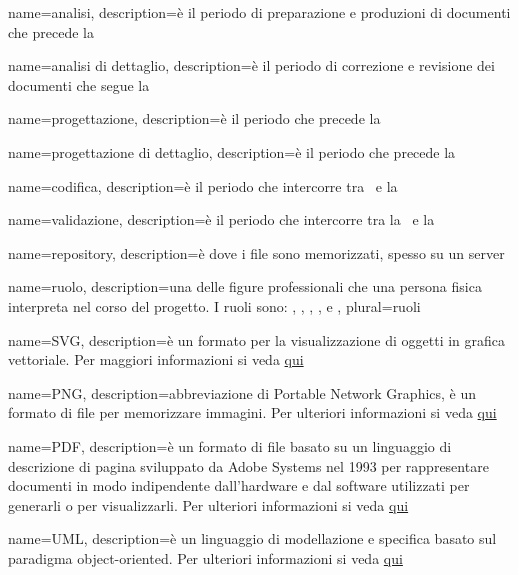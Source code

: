  {
	name=analisi,
	description={è il periodo di preparazione e produzioni di documenti che precede la \RR}
}

 {
	name=analisi di dettaglio,
	description={è il periodo di correzione e revisione dei documenti che segue la \RR{}}
}

 {
	name=progettazione,
	description={è il periodo che precede la \RP}
}

 {
	name=progettazione di dettaglio,
	description={è il periodo che precede la \RP}
}

 {
	name=codifica,
	description={è il periodo che intercorre tra \RP\ e la \RQ}
}

 {
	name=validazione,
	description={è il periodo che intercorre tra la \RQ\ e la \RA}
}

 {
	name=repository,
	description={è dove i file sono memorizzati, spesso su un server}
}

 {
	name=ruolo,
	description={una delle figure professionali che una persona fisica interpreta nel corso del progetto. I ruoli sono: , , , ,  e },
    plural=ruoli
}

 {
	name=SVG,
	description={è un formato per la visualizzazione di oggetti in grafica vettoriale. Per maggiori informazioni si veda \href{https://it.wikipedia.org/wiki/Scalable_Vector_Graphics}{qui}}
}

 {
	name=PNG,
	description={abbreviazione di Portable Network Graphics, è un formato di file per memorizzare immagini. Per ulteriori informazioni si veda \href{http://it.wikipedia.org/wiki/Portable_Network_Graphics}{qui}}
}

 {
	name=PDF,
	description={è un formato di file basato su un linguaggio di descrizione di pagina sviluppato da Adobe Systems nel 1993 per rappresentare documenti in modo indipendente dall’hardware e dal software utilizzati per generarli o per visualizzarli. Per ulteriori informazioni si veda \href{http://it.wikipedia.org/wiki/Portable_Document_Format}{qui}}
}

 {
	name=UML,
	description={è un linguaggio di modellazione e specifica basato sul paradigma object-oriented. Per ulteriori informazioni si veda \href{http://it.wikipedia.org/wiki/Unified_Modeling_Language}{qui}}
}

